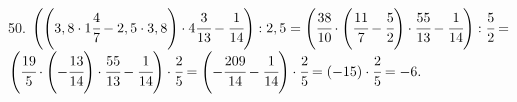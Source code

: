 50. $\left(\left(3,8\cdot1\cfrac{4}{7}-2,5\cdot3,8\right)\cdot4\cfrac{3}{13}-\cfrac{1}{14}\right):2,5=
\left(\cfrac{38}{10}\cdot\left(\cfrac{11}{7}-\cfrac{5}{2}\right)\cdot\cfrac{55}{13}-\cfrac{1}{14}\right):\cfrac{5}{2}=$\\$
\left(\cfrac{19}{5}\cdot\left(-\cfrac{13}{14}\right)\cdot\cfrac{55}{13}-\cfrac{1}{14}\right)\cdot\cfrac{2}{5}=
\left(-\cfrac{209}{14}-\cfrac{1}{14}\right)\cdot\cfrac{2}{5}=(-15)\cdot\cfrac{2}{5}=-6.$\\
